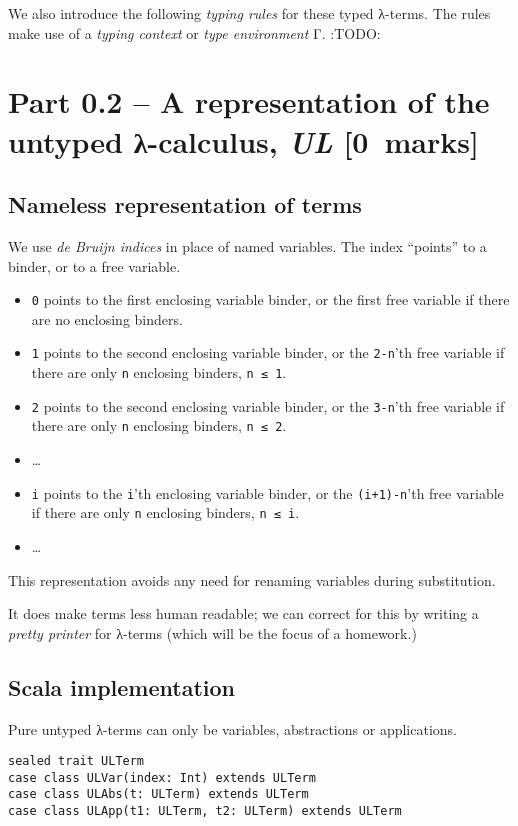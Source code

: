 \documentclass[11pt]{article}
\begin{document}
We also introduce the following \emph{typing rules} for these typed λ-terms.
The rules make use of a \emph{typing context} or \emph{type environment} Γ.
:TODO:

\section*{Part 0.2 – A representation of the untyped λ-calculus, \emph{UL}    [0 marks]}
\label{sec:org1dc2e30}

\subsection*{Nameless representation of terms}
\label{sec:orgf3ead39}

We use \emph{de Bruijn indices} in place of named variables.
The index “points” to a binder, or to a free variable.
\begin{itemize}
\item \texttt{0} points to the first enclosing variable binder,
or the first free variable if there are no enclosing binders.
\item \texttt{1} points to the second enclosing variable binder,
or the \texttt{2-n}'th free variable if there are only \texttt{n} enclosing binders, \texttt{n ≤ 1}.
\item \texttt{2} points to the second enclosing variable binder,
or the \texttt{3-n}'th free variable if there are only \texttt{n} enclosing binders, \texttt{n ≤ 2}.
\item …
\item \texttt{i} points to the \texttt{i}'th enclosing variable binder,
or the \texttt{(i+1)-n}'th free variable if there are only \texttt{n} enclosing binders, \texttt{n ≤ i}.
\item …
\end{itemize}

This representation avoids any need for renaming variables
during substitution.

It does make terms less human readable;
we can correct for this by writing a \emph{pretty printer} for λ-terms
(which will be the focus of a homework.)

\subsection*{Scala implementation}
\label{sec:org82d22e5}

Pure untyped λ-terms can only be variables, abstractions or applications.
\begin{verbatim}
sealed trait ULTerm
case class ULVar(index: Int) extends ULTerm
case class ULAbs(t: ULTerm) extends ULTerm
case class ULApp(t1: ULTerm, t2: ULTerm) extends ULTerm
\end{verbatim}
\end{document}
